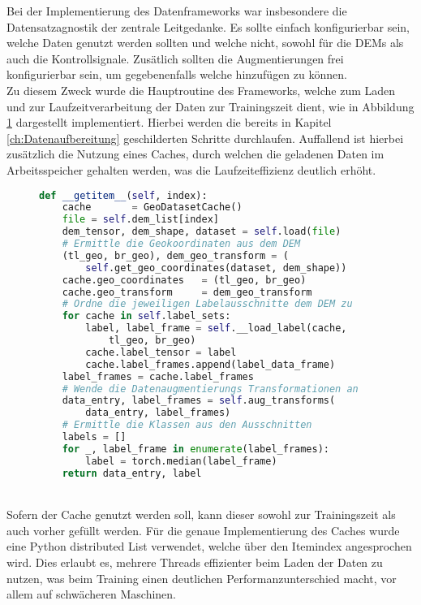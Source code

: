 Bei der Implementierung des Datenframeworks war insbesondere die Datensatzagnostik der zentrale Leitgedanke. Es sollte einfach konfigurierbar sein, welche Daten genutzt werden sollten und welche nicht, sowohl für die \ac{DEM}s als auch die Kontrollsignale. Zusätlich sollten die Augmentierungen frei konfigurierbar sein, um gegebenenfalls welche hinzufügen zu können. \\
Zu diesem Zweck wurde die Hauptroutine des Frameworks, welche zum Laden und zur Laufzeitverarbeitung der Daten zur Trainingszeit dient, wie in Abbildung \ref{fig:Data_runtime} dargestellt implementiert. Hierbei werden die bereits in Kapitel \ref{ch:Datenaufbereitung} geschilderten Schritte durchlaufen. Auffallend ist hierbei zusätzlich die Nutzung eines Caches, durch welchen die geladenen Daten im Arbeitsspeicher gehalten werden, was die Laufzeiteffizienz deutlich erhöht.
\begin{figure}[htbp]
\begin{lstlisting}[language=python]
def __getitem__(self, index):
    cache       = GeoDatasetCache()
    file = self.dem_list[index]
    dem_tensor, dem_shape, dataset = self.load(file)  
    # Ermittle die Geokoordinaten aus dem DEM
    (tl_geo, br_geo), dem_geo_transform = (
        self.get_geo_coordinates(dataset, dem_shape))    
    cache.geo_coordinates   = (tl_geo, br_geo)
    cache.geo_transform     = dem_geo_transform
    # Ordne die jeweiligen Labelausschnitte dem DEM zu 
    for cache in self.label_sets:
        label, label_frame = self.__load_label(cache, 
            tl_geo, br_geo)
        cache.label_tensor = label
        cache.label_frames.append(label_data_frame)
    label_frames = cache.label_frames
    # Wende die Datenaugmentierungs Transformationen an 
    data_entry, label_frames = self.aug_transforms(
        data_entry, label_frames)
    # Ermittle die Klassen aus den Ausschnitten 
    labels = []
    for _, label_frame in enumerate(label_frames):
        label = torch.median(label_frame)
    return data_entry, label
\end{lstlisting}
    \captionsetup{type=figure}
    \label{fig:Data_runtime}
\end{figure} \\
Sofern der Cache genutzt werden soll, kann dieser sowohl zur Trainingszeit als auch vorher gefüllt werden. Für die genaue Implementierung des Caches wurde eine Python distributed List verwendet, welche über den Itemindex angesprochen wird. Dies erlaubt es, mehrere Threads effizienter beim Laden der Daten zu nutzen, was beim Training einen deutlichen Performanzunterschied macht, vor allem auf schwächeren Maschinen. 


